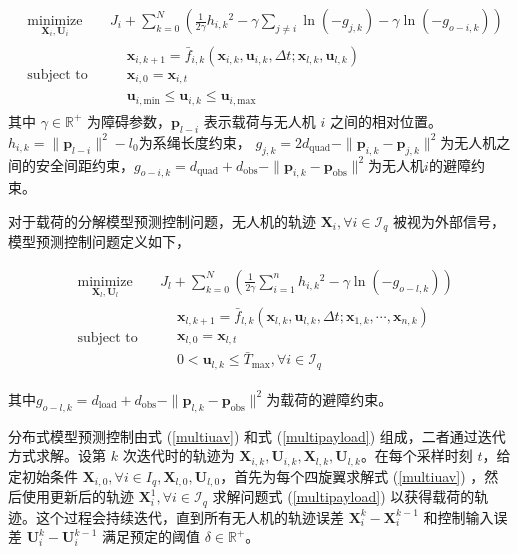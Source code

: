 \documentclass[lang=chs, degree=master, blindreview=true, winfonts=true]{yanputhesis}
\begin{document}
\begin{equation}
	\begin{aligned} 
	&\operatorname*{minimize}_{\bm{X}_i, \bm{U}_i} & & J_i + \sum_{k=0}^{N} \left( \frac{1}{2\gamma} h_{i,k}{}^2 - \gamma \sum_{j \neq i} \ln(-g_{j,k}) -\gamma \ln(-g_{{o-i},k}) \right)\\
	&\text{subject to}& & \begin{aligned}
& \bm{x}_{i,{k+1}} = \bar{f}_{i,k}(\bm{x}_{i,k}, \bm{u}_{i,k}, \Delta t; \bm{x}_{l,k}, \bm{u}_{l,k}) \\
& \bm{x}_{i,0} = \bm{x}_{i,t}\\
& \bm{u}_{i,{\text{min}}} \leq \bm{u}_{i,k} \leq \bm{u}_{i,{\text{max}}}		\end{aligned}	
\end{aligned}
\label{multiuav}
\end{equation}
其中
$\gamma \in \mathbb{R}^+$ 为障碍参数，$\bm p_{l-i}$ 表示载荷与无人机 $i$ 之间的相对位置。
$h_{i,k} = \|\bm p_{l-i}\|^2 - l_0$为系绳长度约束，
$g_{j,k} = 2d_{\text{quad}} - \|\bm p_{i,k} - \bm p_{j,k}\|^2$为无人机之间的安全间距约束，$g_{{o-i},k} = d_{\text{quad}} + d_{\text{obs}} - \|\bm p_{i,k} - \bm p_{\text{obs}}\|^2$为无人机$i$的避障约束。

对于载荷的分解模型预测控制问题，无人机的轨迹 $\bm X_i, \forall i \in \mathcal{I}_q$ 被视为外部信号，模型预测控制问题定义如下，

\begin{equation}
	\begin{aligned} 
	&\operatorname*{minimize}_{\bm{X}_l, \bm{U}_l}& &  J_l + \sum_{k=0}^{N} \left( \frac{1}{2\gamma} \sum_{i=1}^{n} h_{i,k}{}^2 - \gamma \ln(-g_{{o-l},k}) \right)\\
	&\text{subject to}& & \begin{aligned}
& \bm{x}_{l,{k+1}} = \bar{f}_{l,k}(\bm{x}_{l,k}, \bm{u}_{l,k}, \Delta t; \bm{x}_{1,k}, \cdots, \bm{x}_{n,k}) \\
& \bm{x}_{l,0} = \bm{x}_{l,t}\\
& 0 < \bm{u}_{l,k} \leq \bar{T}_{\text{max}}, \forall i \in \mathcal{I}_q		\end{aligned}	
\end{aligned}
\label{multipayload}
\end{equation}

其中$g_{{o-l},k} = d_{\text{load}} + d_{\text{obs}} - \| \bm p_{l,k} - \bm p_{\text{obs}}\|^2$为载荷的避障约束。



分布式模型预测控制由式 (\ref{multiuav}) 和式 (\ref{multipayload}) 组成，二者通过迭代方式求解。设第 $k$ 次迭代时的轨迹为 $\bm X_{i,k}, \bm U_{i,k}, \bm X_{l,k}, \bm U_{l,k}$。在每个采样时刻 $t$，给定初始条件 $\bm X_{i,0}, \forall i \in I_q, \bm X_{l,0}, \bm U_{l,0}$，首先为每个四旋翼求解式 (\ref{multiuav}) ，然后使用更新后的轨迹 $\bm X_i^1, \forall i \in \mathcal{I}_q$ 求解问题式 (\ref{multipayload}) 以获得载荷的轨迹。这个过程会持续迭代，直到所有无人机的轨迹误差 $\bm X_i^k - \bm X_i^{k-1}$ 和控制输入误差 $\bm U_i^k - \bm U_i^{k-1}$ 满足预定的阈值 $\delta \in \mathbb{R}^+$。
\end{document}
